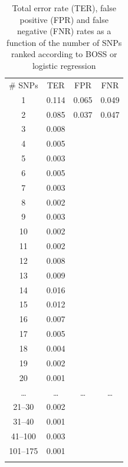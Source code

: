 \begin{table}
\caption{Total error rate (TER), false positive (FPR) and false negative
  (FNR) rates as a function of the number of SNPs ranked according to
  BOSS or logistic regression}
\label{tab:error}       %
\begin{tabular}{cccc}
\hline\noalign{\smallskip}
\# SNPs & TER & FPR & FNR \\
\noalign{\smallskip}\hline\noalign{\smallskip}
1 & 0.114 & 0.065 & 0.049 \\
2 & 0.085 & 0.037 & 0.047 \\
3 & 0.008 &  &  \\
4 & 0.005 &  &  \\
5 & 0.003 &  &  \\
6 & 0.005 &  &  \\
7 & 0.003 &  &  \\
8 & 0.002 &  &  \\
9 & 0.003 &  &  \\
10 & 0.002 &  &  \\
11 & 0.002 &  &  \\
12 & 0.008 &  &  \\
13 & 0.009 &  &  \\
14 & 0.016 &  &  \\
15 & 0.012 &  &  \\
16 & 0.007 &  &  \\
17 & 0.005 &  &  \\
18 & 0.004 &  &  \\
19 & 0.002 &  &  \\
20 & 0.001 &  &  \\
\dots & \dots &  \dots &  \dots \\
21--30 & 0.002  &  &  \\
31--40 & 0.001 &  &  \\
41--100 & 0.003 &  &  \\
101--175 & 0.001 &  &  \\
\noalign{\smallskip}\hline
\end{tabular}
\end{table}



%
%



